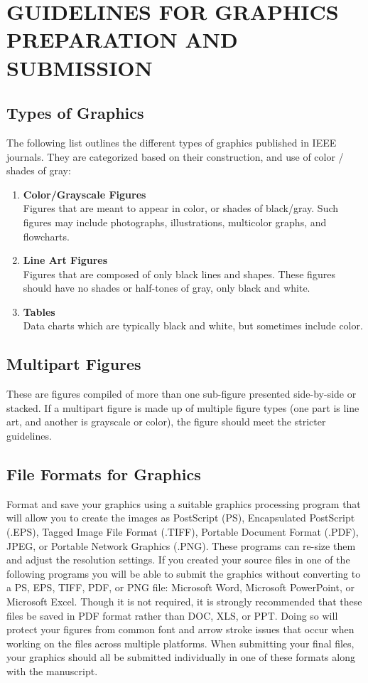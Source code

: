 \documentclass{IEEEtaes}
\begin{document}
\section{GUIDELINES FOR GRAPHICS PREPARATION AND SUBMISSION}

\subsection{Types of Graphics}

The following list outlines the different types of graphics published in IEEE journals. They are categorized based on their construction, and use of color / shades of gray:

\begin{enumerate}
\def\labelenumi{\arabic{enumi})}
\item
  \textbf{Color/Grayscale Figures}\\
  Figures that are meant to appear in color, or shades of black/gray. Such figures may include photographs, illustrations, multicolor graphs, and flowcharts.
\item
  \textbf{Line Art Figures}\\
  Figures that are composed of only black lines and shapes. These figures should have no shades or half-tones of gray, only black and white.
\item
  \textbf{Tables}\\
  Data charts which are typically black and white, but sometimes include color.
\end{enumerate}

\subsection{Multipart Figures}

These are figures compiled of more than one sub-figure presented side-by-side or stacked. If a multipart figure is made up of multiple figure types (one part is line art, and another is grayscale or color), the figure should meet the stricter guidelines.

\subsection{File Formats for Graphics}

Format and save your graphics using a suitable graphics processing program that will allow you to create the images as PostScript (PS), Encapsulated PostScript (.EPS), Tagged Image File Format (.TIFF), Portable Document Format (.PDF), JPEG, or Portable Network Graphics (.PNG). These programs can re-size them and adjust the resolution settings. If you created your source files in one of the following programs you will be able to submit the graphics without converting to a PS, EPS, TIFF, PDF, or PNG file: Microsoft Word, Microsoft PowerPoint, or Microsoft Excel. Though it is not required, it is strongly recommended that these files be saved in PDF format rather than DOC, XLS, or PPT. Doing so will protect your figures from common font and arrow stroke issues that occur when working on the files across multiple platforms. When submitting your final files, your graphics should all be submitted individually in one of these formats along with the manuscript.
\end{document}
